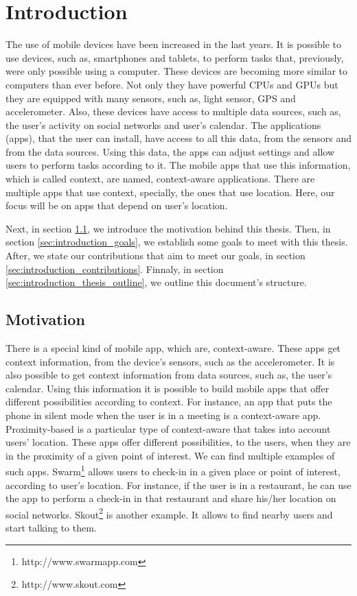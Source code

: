 
\section{Introduction}
\label{sec:introduction}
The use of mobile devices have been increased in the last years.
It is possible to use devices, such as, smartphones and tablets, to perform tasks that, previously, were only possible using a computer.
These devices are becoming more similar to computers than ever before.
Not only they have powerful \glspl{CPU} and \glspl{GPU} but they are equipped with many sensors, such as, light sensor, \gls{GPS} and accelerometer.
Also, these devices have access to multiple data sources, such as,
the user's activity on social networks and user's calendar.
The applications (apps), that the user can install, have access to all this data, from the sensors and from the data sources.
Using this data, the apps can adjust settings and allow users to perform tasks according to it.
The mobile apps that use this information, which is called context, are named, context-aware applications.
There are multiple apps that use context, specially, the ones that use location.
Here, our focus will be on apps that depend on user's location.

Next, in section \ref{sec:introduction_motivation}, we introduce the motivation behind this thesis.
Then, in section \ref{sec:introduction_goals}, we establish some goals to meet with this thesis.
After, we state our contributions that aim to meet our goals, in section \ref{sec:introduction_contributions}.
Finnaly, in section \ref{sec:introduction_thesis_outline}, we outline this document's structure.

\subsection{Motivation}
\label{sec:introduction_motivation}
There is a special kind of mobile app, which are, context-aware.
These apps get context information, from the device's sensors, such as the accelerometer.
It is also possible to get context information from data sources, such as, the user's calendar.
Using this information it is possible to build mobile apps that offer different possibilities according to context.
For instance, an app that puts the phone in silent mode when the user is in a meeting is a context-aware app.
Proximity-based is a particular type of context-aware that takes into account users' location.
These apps offer different possibilities, to the users, when they are in the proximity of a given point of interest.
We can find multiple examples of such apps.
Swarm\footnote{http://www.swarmapp.com} allows users to check-in in a given place or point of interest, according to user's location.
For instance, if the user is in a restaurant, he can use the app to perform a check-in in that restaurant and share his/her location on social networks.
Skout\footnote{http://www.skout.com}
is another example. It allows to find nearby users and start talking to them.

